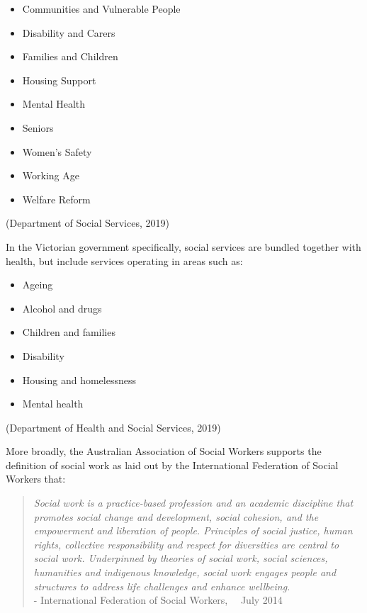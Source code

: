\documentclass[
  11pt,
]{article}
\providecommand{\tightlist}{%
  \setlength{\itemsep}{0pt}\setlength{\parskip}{0pt}}
\begin{document}
\begin{itemize}
\tightlist
\item
  Communities and Vulnerable People
\item
  Disability and Carers
\item
  Families and Children
\item
  Housing Support
\item
  Mental Health
\item
  Seniors
\item
  Women's Safety
\item
  Working Age
\item
  Welfare Reform
\end{itemize}

(Department of Social Services, 2019)

In the Victorian government specifically, social services are bundled together with health, but include services operating in areas such as:

\begin{itemize}
\tightlist
\item
  Ageing
\item
  Alcohol and drugs
\item
  Children and families
\item
  Disability
\item
  Housing and homelessness
\item
  Mental health
\end{itemize}

(Department of Health and Social Services, 2019)

\newpage

More broadly, the Australian Association of Social Workers supports the definition of social work as laid out by the International Federation of Social Workers that:

\begin{quote}
\emph{Social work is a practice-based profession and an academic discipline that promotes social change and development, social cohesion, and the empowerment and liberation of people. Principles of social justice, human rights, collective responsibility and respect for diversities are central to social work. Underpinned by theories of social work, social sciences, humanities and indigenous knowledge, social work engages people and structures to address life challenges and enhance wellbeing.}\\
\quad - International Federation of Social Workers, \newline \quad \quad ~~July 2014
\end{quote}
\end{document}

